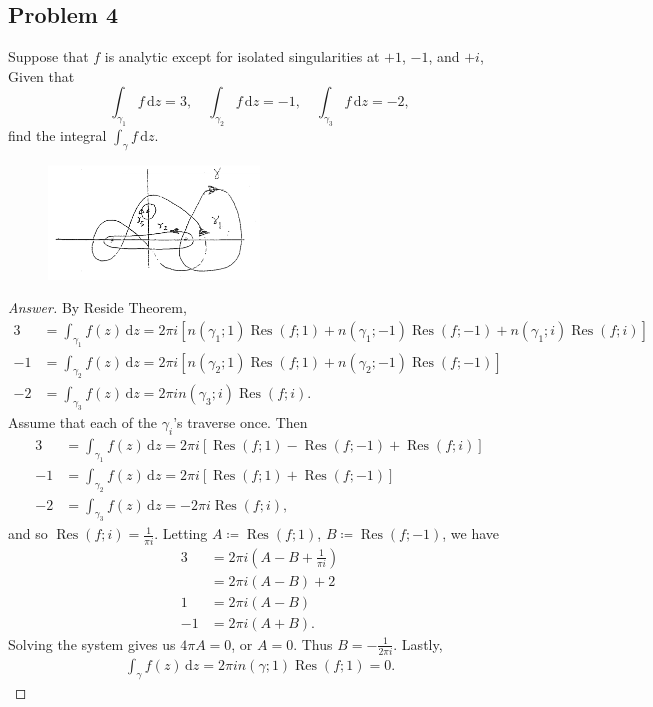 \documentclass[12pt]{article}
\newcommand\paren[1]{\left( #1 \right)}
\newcommand{\sqbrack}[1]{\left [ #1 \right ]}
\theoremstyle{definition}
\DeclareMathOperator\Res{Res}
\begin{document}
\subsection{Problem 4 \texorpdfstring{\cite{Elbow}}{}}
Suppose that $f$ is analytic except for isolated singularities at $+1$, $-1$, and $+i$, Given that 
\[
    \int_{\gamma_1} f \, \mathrm{d} z = 3 , \quad \int_{\gamma_2} f \, \mathrm{d} z = -1 , \quad \int_{\gamma_3} f \, \mathrm{d} z = -2,
\]
find the integral $\int_{\gamma} f \, \mathrm{d} z$.
\begin{figure}[H]
    \centering
    \includegraphics[width = 0.5\textwidth]{1.png}
    \caption{}
    \label{fig:fig2}
\end{figure}
\begin{proof}[Answer]
    By Reside Theorem,
    \begin{align*}
        3 & = \int_{\gamma_1} f(z) \, \mathrm{d}z = 2\pi i \sqbrack{ n(\gamma_1;1) \Res(f;1) + n(\gamma_1;-1) \Res(f;-1) + n(\gamma_1;i) \Res(f;i) } \\
        -1 & = \int_{\gamma_2} f(z) \, \mathrm{d}z = 2\pi i \sqbrack{ n(\gamma_2;1) \Res(f;1) + n(\gamma_2;-1) \Res(f;-1) } \\
        -2 & = \int_{\gamma_3} f(z) \, \mathrm{d}z = 2\pi i n(\gamma_3;i) \Res(f;i).
    \end{align*}
    Assume that each of the $\gamma_i$'s traverse once. Then
    \begin{align*}
        3 & = \int_{\gamma_1} f(z) \, \mathrm{d}z = 2\pi i \sqbrack{ \Res(f;1) - \Res(f;-1) + \Res(f;i) } \\
        -1 & = \int_{\gamma_2} f(z) \, \mathrm{d}z = 2\pi i \sqbrack{ \Res(f;1) + \Res(f;-1) } \\
        -2 & = \int_{\gamma_3} f(z) \, \mathrm{d}z = -2\pi i \Res(f;i),
    \end{align*}
    and so $\Res(f;i) = \frac{1}{\pi i}$. Letting $A \coloneqq \Res(f;1)$, $B \coloneqq \Res(f;-1)$, we have
    \begin{align*}
        3 & = 2\pi i \paren{ A - B + \frac{1}{\pi i} } \\
        & = 2\pi i ( A - B ) + 2 \\
        1 & = 2\pi i (A - B) \\
        -1 & = 2\pi i (A + B).
    \end{align*}
    Solving the system gives us $4 \pi A = 0$, or $A = 0$. Thus $B = -\frac{1}{2\pi i}$. Lastly, 
    \begin{align*}
        \int_{\gamma} f(z) \, \mathrm{d}z = 2\pi i n(\gamma;1) \Res(f;1) = \boxed{0.}
    \end{align*}
\end{proof}
\end{document}
